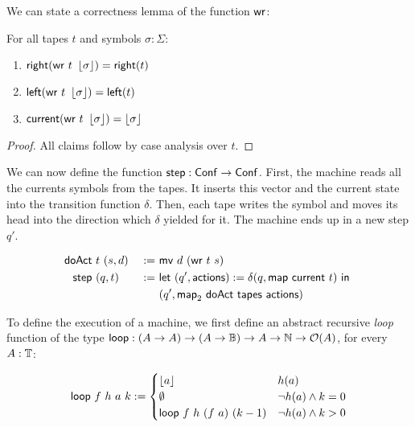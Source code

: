 We can state a correctness lemma of the function $\MS{wr}$:

\begin{lemma}[Correctness of $\MS{wr}$]
  \label{lem:write}
  For all tapes $t$ and symbols $\sigma:\Sigma$:
  \begin{enumerate}
  \item $\mathsf{right}   (\mathsf{wr}~t~\left\lfloor {\sigma} \right\rfloor) = \mathsf{right}(t)$
  \item $\mathsf{left}    (\mathsf{wr}~t~\left\lfloor {\sigma} \right\rfloor) = \mathsf{left} (t)$
  \item $\mathsf{current} (\mathsf{wr}~t~\left\lfloor {\sigma} \right\rfloor) = \left\lfloor {\sigma} \right\rfloor$
  \end{enumerate}
\end{lemma}
\begin{proof}
  All claims follow by case analysis over $t$.
\end{proof}

We can now define the function $\mathsf{step} : \mathsf{Conf} \rightarrow \mathsf{Conf}$.  First, the machine reads all the currents symbols from the tapes.  It inserts this
vector and the current state into the transition function $\delta$.  Then, each tape writes the symbol and moves its head into the direction which
$\delta$ yielded for it.  The machine ends up in a new step $q'$.

\begin{definition}[$\MS{step}$]
  \label{def:step}
  \begin{alignat*}{2}
    \mathsf{doAct} &~t~(s, d) &~:=~& \mathsf{mv}~d~(\mathsf{wr}~t~s) \\
    \mathsf{step}  &~(q, t)   &~:=~& \mathsf{let}~(q', \mathsf{actions}) := \delta(q, \mathsf{map}~\mathsf{current}~t)~\mathsf{in}~ \\
               &          &~  ~& (q', \mathsf{map}_2~\mathsf{doAct}~\mathsf{tapes}~\mathsf{actions})
  \end{alignat*}
\end{definition}

To define the execution of a machine, we first define an abstract recursive \emph{loop} function of the type
$\mathsf{loop} : (A \rightarrow A) \rightarrow (A \rightarrow \mathbb{B}) \rightarrow A \rightarrow \mathbb{N} \rightarrow \mathcal{O}(A)$, for every $A:\mathbb{T}$:

\begin{definition}[$\Loop$]
  \begin{align*}
    \mathsf{loop}~f~h~a~k :=
    \begin{cases}
      \left\lfloor {a} \right\rfloor               & h(a) \\
      \emptyset                  & \lnot h(a) \land k = 0 \\
      \mathsf{loop}~f~h~(f~a)~(k-1)  & \lnot h(a) \land k > 0
    \end{cases}
  \end{align*}
\end{definition}

